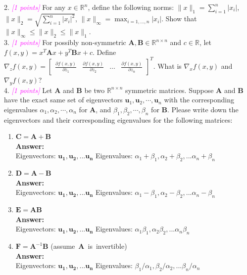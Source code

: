 \documentclass{article}
\newcommand{\field}[1]{\mathbb{#1}}
\newcommand{\1}{\mathbf{1}}
\newcommand{\R}{\field{R}} %
\newcommand{\vct}[1]{\boldsymbol{#1}} %
\newcommand{\mat}[1]{\boldsymbol{#1}} %
\newcommand{\grade}[1]{\small\textcolor{magenta}{\emph{[#1 points]}} \normalsize}
\begin{document}
2. \grade{1} For any $x \in \R^n$, define the following norms: $\|x\|_1 = \sum_{i=1}^n |x_i|$, $\|x\|_2 = \sqrt{\sum_{i=1}^n |x_i|^2}$, $\|x\|_\infty = \max_{i=1,\dots,n} |x_i|$. Show that $\|x\|_\infty \leq \|x\|_2 \leq \|x\|_1$.\\

3. \grade{1} For possibly non-symmetric $\mat{A}, \mat{B} \in \R^{n \times n}$ and $c \in \R$, let $f(x, y) = x^T \mat{A} x + y^T \mat{B} x + c$. Define $\nabla_z f(x,y) = \begin{bmatrix} \frac{\partial f(x,y)}{\partial z_1} & \frac{\partial f(x,y)}{\partial z_2} & \dots & \frac{\partial f(x,y)}{\partial z_n} \end{bmatrix}^T$.  What is $\nabla_x f(x,y)$ and $\nabla_y f(x,y)$? \\

4. \grade{1} Let $\mat{A}$ and $\mat{B}$ be two $\R^{n\times n}$ symmetric
matrices. Suppose $\mat{A}$ and $\mat{B}$ have the exact same set of eigenvectors
$\vct{u}_1, \vct{u}_2, \cdots, \vct{u}_n$ with the corresponding
eigenvalues $\alpha_1, \alpha_2, \cdots, \alpha_{n}$ for $\mat{A}$, and
$\beta_1, \beta_2, \cdots, \beta_{n}$ for $\mat{B}$. Please write down
the eigenvectors and their corresponding eigenvalues for the following matrices:
\begin{enumerate}
\item $\mat{C} = \mat{A}+\mat{B}$\\
\textbf{Answer:} \\
Eigenvectors: $\mathbf{u_1},\mathbf{u_2},...\mathbf{u_n}$	Eigenvalues: $\alpha_1+\beta_1, \alpha_2+\beta_2,...\alpha_n+\beta_n$
\item $\mat{D} = \mat{A} - \mat{B}$\\
\textbf{Answer:} \\
Eigenvectors: $\mathbf{u_1},\mathbf{u_2},...\mathbf{u_n}$	Eigenvalues: $\alpha_1-\beta_1, \alpha_2-\beta_2,...\alpha_n-\beta_n$
\item $\mat{E} = \mat{A}\mat{B}$\\
\textbf{Answer:} \\
Eigenvectors: $\mathbf{u_1},\mathbf{u_2},...\mathbf{u_n}$	Eigenvalues: $\alpha_1\beta_1, \alpha_2\beta_2,...\alpha_n\beta_n$
\item $\mat{F} = \mat{A}^{-1}\mat{B}$ (\mbox{assume $\mat{A}$ is invertible})\\
\textbf{Answer:} \\
Eigenvectors: $\mathbf{u_1},\mathbf{u_2},...\mathbf{u_n}$	Eigenvalues: $\beta_1/\alpha_1, \beta_2/\alpha_2,...\beta_n/\alpha_n$
\end{enumerate}
\end{document}
